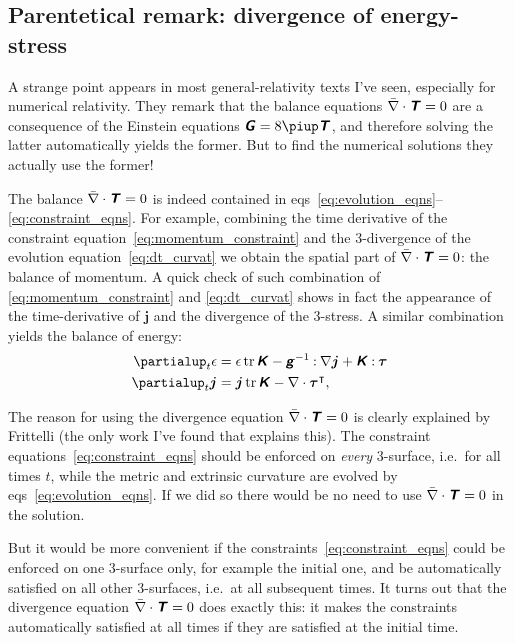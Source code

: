 \documentclass[\ifafour a4paper,12pt,\else a5paper,10pt,\fi%
onecolumn,oneside,article,%
british%
]{memoir}
\theoremstyle{remark}
\theoremstyle{innote}
\newcommand*{\mathte}[1]{\textbf{\textit{\textsf{#1}}}}
\newcommand*{\citey}{\parencites*}
\newcommand*{\de}{\partialup}%
\newcommand*{\pu}{\piup}%
\DeclareMathOperator{\tr}{tr}%
\newcommand*{\con}{\mathbin{:}}%
\renewcommand*{\|}{\nonscript\,\vert\nonscript\;\mathopen{}}
\newcommand*{\eqns}{eqs}%
\newcommand*{\ie}{{i.e.}}
\newcommand*{\T}{^\intercal}%
\newcommand*{\yGG}{G}
\newcommand*{\yG}{\mathte{\yGG}}
\newcommand*{\yTT}{\tau}
\newcommand*{\yT}{\bm{\yTT}}
\newcommand*{\yTTf}{T}
\newcommand*{\yTf}{\mathte{\yTTf}}
\newcommand*{\ygg}{g}
\newcommand*{\yg}{\mathte{\ygg}}
\newcommand*{\yKK}{K}
\newcommand*{\yK}{\mathte{\yKK}}
\newcommand*{\ypp}{j}
\newcommand*{\yp}{\bm{\ypp}}
\newcommand*{\ye}{\epsilon}
\newcommand*{\ynab}{\nabla}
\newcommand*{\ynaf}{\Bar{\nabla}}
\begin{document}
\subsection{Parentetical remark: divergence of energy-stress}
\label{sec:divergence_4stress}

A strange point appears in most general-relativity texts I've seen,
especially for numerical relativity. They remark that the balance equations
$\ynaf\cdot\yTf = 0$ are a consequence of the Einstein equations
$\yG = 8\pu \yTf$, and therefore solving the latter automatically yields
the former. But to find the numerical solutions they actually use the
former!

The balance $\ynaf\cdot\yTf = 0$ is indeed contained in
\eqns~\eqref{eq:evolution_eqns}--\eqref{eq:constraint_eqns}. For example,
combining the time derivative of the constraint
equation~\eqref{eq:momentum_constraint} and the 3-divergence of the
evolution equation~\eqref{eq:dt_curvat} we obtain the spatial part of
$\ynaf\cdot\yTf = 0$: the balance of momentum. A quick check of such
combination of \eqref{eq:momentum_constraint} and \eqref{eq:dt_curvat}
shows in fact the appearance of the time-derivative of $\yp$ and the
divergence of the 3-stress. A similar combination yields the balance of
energy:
\begin{subequations}\label{eq:evolution_energy_momentum}
  \begin{align}
    \label{eq:dt_energy}
    \de_t \ye &= \ye\tr\yK - \yg^{-1}\con\ynab\yp + \yK\con\yT
    \\
    \label{eq:dt_momentum}
    \de_t \yp &=  \yp\tr\yK - \ynab\cdot\yT\T,
  \end{align}
\end{subequations}

The reason for using the divergence equation $\ynaf\cdot\yTf = 0$ is
clearly explained by Frittelli \citey{frittelli1997} (the only work I've
found that explains this). The constraint
equations~\eqref{eq:constraint_eqns} should be enforced on \emph{every}
3-surface, \ie\ for all times $t$, while the metric and extrinsic curvature
are evolved by \eqns~\eqref{eq:evolution_eqns}. If we did so there would be
no need to use $\ynaf\cdot\yTf = 0$ in the solution.

But it would be more convenient if the
constraints~\eqref{eq:constraint_eqns} could be enforced on one 3-surface
only, for example the initial one, and be automatically satisfied on all
other 3-surfaces, \ie\ at all subsequent times. It turns out that the
divergence equation $\ynaf\cdot\yTf = 0$ does exactly this: it makes the
constraints automatically satisfied at all times if they are satisfied at
the initial time.
\end{document}
